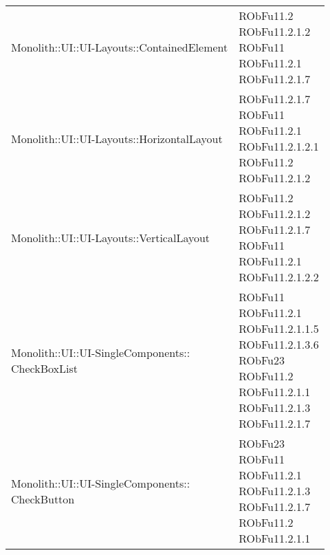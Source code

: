 \begin{center}
\begin{longtable}{|
*{1}{>{\centering\arraybackslash}m{7.5cm}|}
*{1}{>{\centering\arraybackslash}m{2.5cm}|}}
{\\RObFu11.2
\\RObFu11.2.1.2
\\RObFu11.2.1.7
\\}\\\hline
Monolith::UI::UI-Layouts::ContainedElement & \makecell{RObFu11.2
\\RObFu11.2.1.2
\\RObFu11
\\RObFu11.2.1
\\RObFu11.2.1.7
\\}\\\hline
Monolith::UI::UI-Layouts::HorizontalLayout & \makecell{RObFu11.2.1.7
\\RObFu11
\\RObFu11.2.1
\\RObFu11.2.1.2.1
\\RObFu11.2
\\RObFu11.2.1.2
\\}\\\hline
Monolith::UI::UI-Layouts::VerticalLayout & \makecell{RObFu11.2
\\RObFu11.2.1.2
\\RObFu11.2.1.7
\\RObFu11
\\RObFu11.2.1
\\RObFu11.2.1.2.2
\\}\\\hline
\makecell[l]{Monolith::UI::UI-SingleComponents:: \\ \hfill CheckBoxList} & \makecell{RObFu11
\\RObFu11.2.1
\\RObFu11.2.1.1.5
\\RObFu11.2.1.3.6
\\RObFu23
\\RObFu11.2
\\RObFu11.2.1.1
\\RObFu11.2.1.3
\\RObFu11.2.1.7
\\}\\\hline
\makecell[l]{Monolith::UI::UI-SingleComponents:: \\ \hfill CheckButton} & \makecell{RObFu23
\\RObFu11
\\RObFu11.2.1
\\RObFu11.2.1.3
\\RObFu11.2.1.7
\\RObFu11.2
\\RObFu11.2.1.1
}
\end{longtable}
\end{center}
